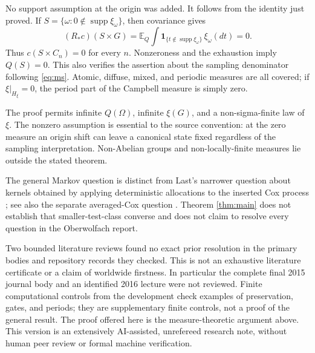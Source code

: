 \documentclass[11pt]{article}
\newcommand{\ind}{\mathbf 1}
\newcommand{\EQ}{\mathbb E_Q}
\newcommand{\supp}{\operatorname{supp}}
\begin{document}
No support assumption at the origin was added. It follows from the identity just proved. If $S=\{\omega:0\notin\supp\xi_\omega\}$, then covariance gives
\[
 (R_*c)(S\times G)=\EQ\int\ind_{\{t\notin\supp\xi_\omega\}}\,\xi_\omega(dt)=0.
\]
Thus $c(S\times C_n)=0$ for every $n$. Nonzeroness and the exhaustion imply $Q(S)=0$. This also verifies the assertion about the sampling denominator following \eqref{eq:ms}. Atomic, diffuse, mixed, and periodic measures are all covered; if $\xi|_{H_\xi}=0$, the period part of the Campbell measure is simply zero.

The proof permits infinite $Q(\Omega)$, infinite $\xi(G)$, and a non-sigma-finite law of $\xi$. The nonzero assumption is essential to the source convention: at the zero measure an origin shift can leave a canonical state fixed regardless of the sampling interpretation. Non-Abelian groups and non-locally-finite measures lie outside the stated theorem.

The general Markov question is distinct from Last's narrower question about kernels obtained by applying deterministic allocations to the inserted Cox process \cite[p.\ 2673]{OWR}; see also the separate averaged-Cox question \cite[Remark 4.8]{LT11}. Theorem \ref{thm:main} does not establish that smaller-test-class converse and does not claim to resolve every question in the Oberwolfach report.

Two bounded literature reviews found no exact prior resolution in the primary bodies and repository records they checked. This is not an exhaustive literature certificate or a claim of worldwide firstness. In particular the complete final 2015 journal body and an identified 2016 lecture were not reviewed. Finite computational controls from the development check examples of preservation, gates, and periods; they are supplementary finite controls, not a proof of the general result. The proof offered here is the measure-theoretic argument above. This version is an extensively AI-assisted, unrefereed research note, without human peer review or formal machine verification.
\end{document}
